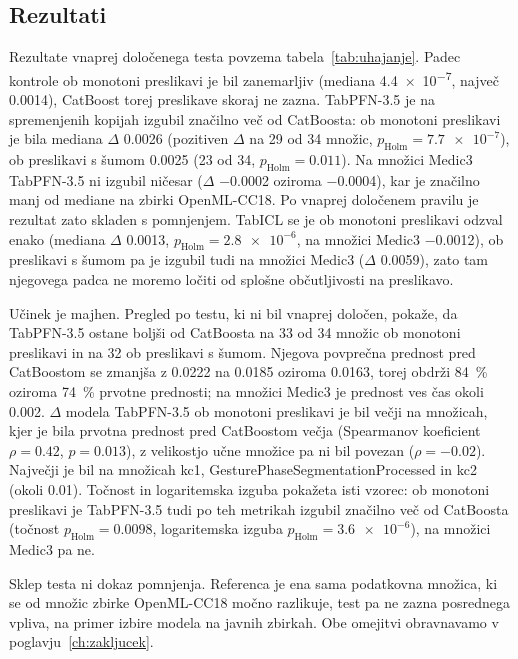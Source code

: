 \documentclass[a4paper,12pt,openright]{book}
\begin{document}
\subsection{Rezultati}



Rezultate vnaprej določenega testa povzema tabela~\ref{tab:uhajanje}. Padec
kontrole ob monotoni preslikavi je bil zanemarljiv (mediana \num{4.4e-7},
največ \num{0.0014}), CatBoost torej preslikave skoraj ne zazna. TabPFN-3.5 je
na spremenjenih kopijah izgubil značilno več od CatBoosta: ob monotoni
preslikavi je bila mediana $\Delta$ \num{0.0026} (pozitiven $\Delta$ na 29 od 34
množic, $p_\mathrm{Holm} = \num{7.7e-7}$), ob preslikavi s šumom \num{0.0025} (23
od 34, $p_\mathrm{Holm} = \num{0.011}$). Na množici Medic3 TabPFN-3.5 ni izgubil
ničesar ($\Delta$ \num{-0.0002} oziroma \num{-0.0004}), kar je značilno manj od
mediane na zbirki OpenML-CC18. Po vnaprej določenem pravilu je rezultat zato
skladen s pomnjenjem. TabICL se je ob monotoni preslikavi odzval enako (mediana
$\Delta$ \num{0.0013}, $p_\mathrm{Holm} = \num{2.8e-6}$, na množici Medic3
\num{-0.0012}), ob preslikavi s šumom pa je izgubil tudi na množici Medic3
($\Delta$ \num{0.0059}), zato tam njegovega padca ne moremo ločiti od splošne
občutljivosti na preslikavo.

Učinek je majhen. Pregled po testu, ki ni bil vnaprej določen, pokaže, da
TabPFN-3.5 ostane boljši od CatBoosta na 33 od 34 množic ob monotoni preslikavi
in na 32 ob preslikavi s šumom. Njegova povprečna prednost pred CatBoostom se
zmanjša z \num{0.0222} na \num{0.0185} oziroma \num{0.0163}, torej obdrži
\SI{84}{\percent} oziroma \SI{74}{\percent} prvotne prednosti; na množici
Medic3 je prednost ves čas okoli \num{0.002}. $\Delta$ modela TabPFN-3.5 ob
monotoni preslikavi je bil večji na množicah, kjer je bila prvotna prednost
pred CatBoostom večja (Spearmanov koeficient $\rho = \num{0.42}$, $p =
\num{0.013}$), z velikostjo učne množice pa ni bil povezan ($\rho =
\num{-0.02}$). Največji je bil na množicah kc1, GesturePhaseSegmentationProcessed
in kc2 (okoli \num{0.01}). Točnost in logaritemska izguba pokažeta isti vzorec:
ob monotoni preslikavi je TabPFN-3.5 tudi po teh metrikah izgubil značilno več
od CatBoosta (točnost $p_\mathrm{Holm} = \num{0.0098}$, logaritemska izguba
$p_\mathrm{Holm} = \num{3.6e-6}$), na množici Medic3 pa ne.

Sklep testa ni dokaz pomnjenja. Referenca je ena sama podatkovna množica, ki
se od množic zbirke OpenML-CC18 močno razlikuje, test pa ne zazna posrednega
vpliva, na primer izbire modela na javnih zbirkah. Obe omejitvi obravnavamo v
poglavju~\ref{ch:zakljucek}.
\end{document}
